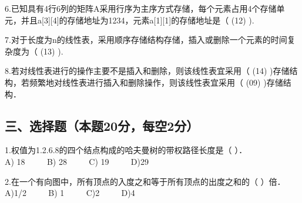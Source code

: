 6.已知具有4行6列的矩阵A采用行序为主序方式存储，每个元素占用4个存储单元，并且a[3][4]的存储地址为1234，元素a[1][1]的存储地址是（ (12) ).

7.对于长度为n的线性表，采用顺序存储结构存储，插入或删除一个元素的时间复杂度为（ (13) ).

8.若对线性表进行的操作主要不是插入和删除，则该线性表宜采用（ (14) )存储结构，若频繁地对线性表进行插入和删除操作，则该线性表宜采用（ (09) )存储结构．

\subsection{三、选择题（本题20分，每空2分）}
1.权值为{1.2.6.8}的四个结点构成的哈夫曼树的带权路径长度是（  ）． \\
A) 18 $\qquad$ B) 28 $\qquad$ C) 19 $\qquad$ D)29

2.在一个有向图中，所有顶点的入度之和等于所有顶点的出度之和的（ ）倍． \\
A)1/2 $\qquad$ B) 1 $\qquad$ C)2 $\qquad$ D)4

